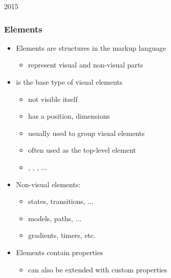 \begin{slide}{2015}\frametitle{Elements}

\begin{itemize}
\item Elements are structures in the markup language
  \begin{itemize}
  \item represent visual and non-visual parts
  \end{itemize}
\item {} is the base type of visual elements
  \begin{itemize}
  \item not visible itself
  \item has a position, dimensions
  \item usually used to group visual elements
  \item often used as the top-level element
  \item {}, , , ...
  \end{itemize}
\item Non-visual elements:
  \begin{itemize}
  \item states, transitions, ...
  \item models, paths, ...
  \item gradients, timers, etc.
  \end{itemize}
\item Elements contain properties
  \begin{itemize}
  \item can also be extended with custom properties
  \end{itemize}
\end{itemize}



\end{slide}


